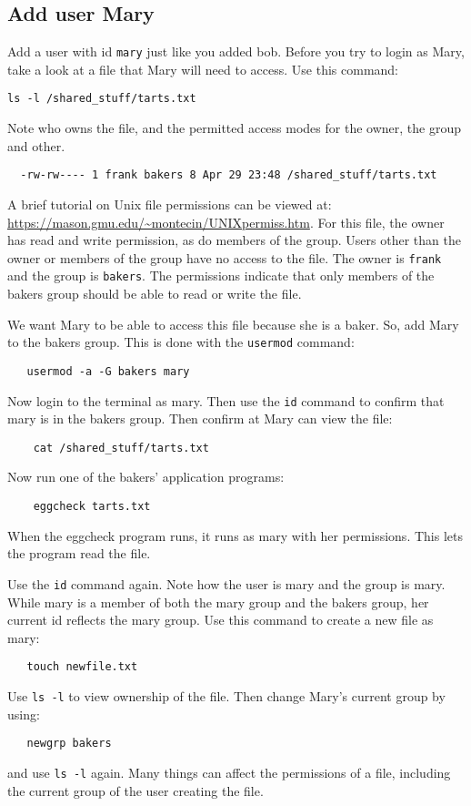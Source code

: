\subsection{Add user Mary}
Add a user with id {\tt mary} just like you added bob.  Before you try to login as Mary, take a look at a file
that Mary will need to access.  Use this command:
\begin{verbatim}
ls -l /shared_stuff/tarts.txt
\end{verbatim}
\noindent Note who owns the file, and the permitted access modes for the owner, the group and other.  
\begin{verbatim}
  -rw-rw---- 1 frank bakers 8 Apr 29 23:48 /shared_stuff/tarts.txt
\end{verbatim}
A brief tutorial on Unix file permissions can be viewed at: \url{https://mason.gmu.edu/~montecin/UNIXpermiss.htm}.
For this file, the owner has read and write permission, as do members of the group. Users other than the owner
or members of the group have no access to the file. The owner is {\tt frank}
and the group is {\tt bakers}.   The permissions indicate that only members of the bakers group should be able
to read or write the file.

We want Mary to 
be able to access this file because she is a baker.  So, add Mary to the bakers group.  This is done with the {\tt usermod}
command:
\begin{verbatim}
   usermod -a -G bakers mary
\end{verbatim}
Now login to the terminal as mary.  Then use the {\tt id} command to confirm that mary is in the bakers group.
Then confirm at Mary can view the file:
\begin{verbatim}
    cat /shared_stuff/tarts.txt
\end{verbatim}
\noindent Now run one of the bakers' application programs:
\begin{verbatim}
    eggcheck tarts.txt
\end{verbatim}
\noindent When the eggcheck program runs, it runs as mary with her permissions.  This lets the program read the file.

Use the {\tt id} command again.  Note how the user is mary and the group is mary.  While mary is a member of both the
mary group and the bakers group, her current id reflects the mary group.  Use this command to create a new file as mary:
\begin{verbatim}
   touch newfile.txt
\end{verbatim}
Use {\tt ls -l} to view ownership of the file.  Then change Mary's current group by using:
\begin{verbatim}
   newgrp bakers
\end{verbatim}
\noindent and use {\tt ls -l} again.  Many things can affect the permissions of a file, including the current group
of the user creating the file.

